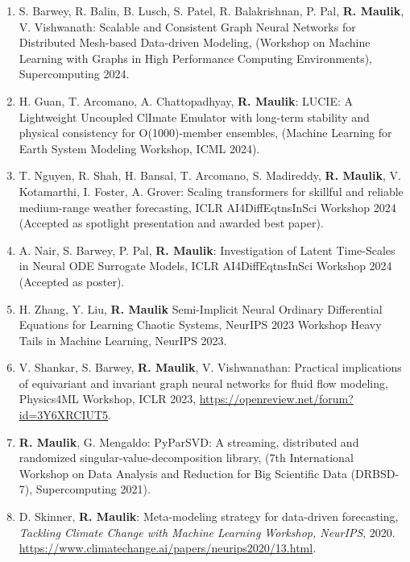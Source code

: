 \documentclass[letterpaper]{article}
\begin{document}
\begin{enumerate}
\item S. Barwey, R. Balin, B. Lusch, S. Patel, R. Balakrishnan, P. Pal, \textbf{R. Maulik}, V. Vishwanath: Scalable and Consistent Graph Neural Networks for Distributed Mesh-based Data-driven Modeling, (Workshop on Machine Learning with Graphs in High Performance Computing Environments), Supercomputing 2024.

\item H. Guan, T. Arcomano, A. Chattopadhyay, \textbf{R. Maulik}: LUCIE: A Lightweight Uncoupled ClImate Emulator with long-term stability and physical consistency for O(1000)-member ensembles, (Machine Learning for Earth System Modeling Workshop, ICML 2024).

\item T. Nguyen, R. Shah, H. Bansal, T. Arcomano, S. Madireddy, \textbf{R. Maulik}, V. Kotamarthi, I. Foster, A. Grover: Scaling transformers for skillful and reliable medium-range weather forecasting, ICLR AI4DiffEqtnsInSci Workshop 2024 (Accepted as spotlight presentation and awarded best paper).

\item A. Nair, S. Barwey, P. Pal, \textbf{R. Maulik}: Investigation of Latent Time-Scales in Neural ODE Surrogate Models, ICLR AI4DiffEqtnsInSci Workshop 2024 (Accepted as poster).

\item H. Zhang, Y. Liu, \textbf{R. Maulik} Semi-Implicit Neural Ordinary Differential Equations for Learning Chaotic Systems, NeurIPS 2023 Workshop Heavy Tails in Machine Learning, NeurIPS 2023.

\item V. Shankar, S. Barwey, \textbf{R. Maulik}, V. Vishwanathan: Practical implications of equivariant and invariant graph neural networks for fluid flow modeling, Physics4ML Workshop, ICLR 2023, \url{https://openreview.net/forum?id=3Y6XRCIUT5}.

\item \textbf{R. Maulik}, G. Mengaldo: PyParSVD: A streaming, distributed and randomized singular-value-decomposition library, (7th International Workshop on Data Analysis and Reduction for Big Scientific Data (DRBSD-7), Supercomputing 2021).

\item D. Skinner, \textbf{R. Maulik}: Meta-modeling strategy for data-driven forecasting, \textit{Tackling Climate Change with Machine Learning Workshop, NeurIPS}, 2020. \url{https://www.climatechange.ai/papers/neurips2020/13.html}. 


\end{enumerate}
\end{document}

